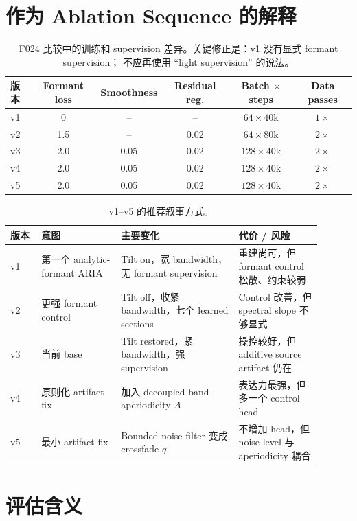 \documentclass[11pt,fontset=none]{ctexart}
\newcommand{\ap}{A}
\begin{document}
\section{作为 Ablation Sequence 的解释}

\begin{table}[H]
\centering
\small
\begin{tabular}{@{}lccccc@{}}
\toprule
版本 & Formant loss & Smoothness & Residual reg. & Batch $\times$ steps & Data passes \\
\midrule
v1 & 0 & -- & -- & $64\times40$k & $1\times$ \\
v2 & 1.5 & -- & 0.02 & $64\times80$k & $2\times$ \\
v3 & 2.0 & 0.05 & 0.02 & $128\times40$k & $2\times$ \\
v4 & 2.0 & 0.05 & 0.02 & $128\times40$k & $2\times$ \\
v5 & 2.0 & 0.05 & 0.02 & $128\times40$k & $2\times$ \\
\bottomrule
\end{tabular}
\caption{F024 比较中的训练和 supervision 差异。关键修正是：v1 没有显式 formant supervision；
不应再使用 ``light supervision'' 的说法。}
\end{table}

\begin{table}[H]
\centering
\small
\begin{tabular}{@{}L{0.09\linewidth}L{0.23\linewidth}L{0.34\linewidth}L{0.24\linewidth}@{}}
\toprule
版本 & 意图 & 主要变化 & 代价 / 风险 \\
\midrule
v1 & 第一个 analytic-formant ARIA & Tilt on，宽 bandwidth，无 formant supervision & 重建尚可，但 formant control 松散、约束较弱 \\
v2 & 更强 formant control & Tilt off，收紧 bandwidth，七个 learned sections & Control 改善，但 spectral slope 不够显式 \\
v3 & 当前 base & Tilt restored，紧 bandwidth，强 supervision & 操控较好，但 additive source artifact 仍在 \\
v4 & 原则化 artifact fix & 加入 decoupled band-aperiodicity $\ap$ & 表达力最强，但多一个 control head \\
v5 & 最小 artifact fix & Bounded noise filter 变成 crossfade $q$ & 不增加 head，但 noise level 与 aperiodicity 耦合 \\
\bottomrule
\end{tabular}
\caption{v1--v5 的推荐叙事方式。}
\end{table}

\section{评估含义}
\end{document}
